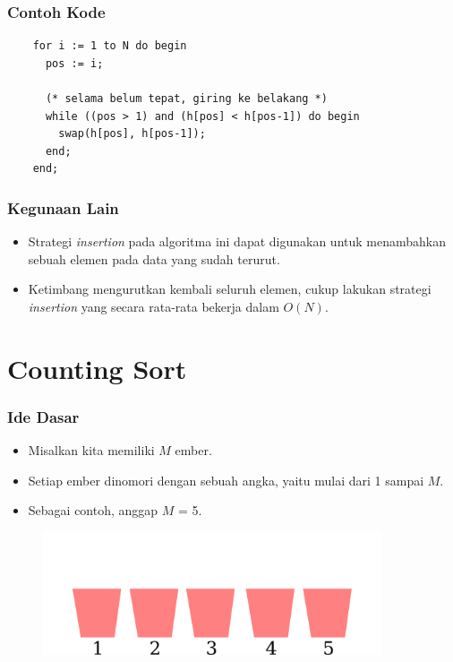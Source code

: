 \begin{frame}[fragile]
\frametitle{Contoh Kode}
  \begin{lstlisting}
    for i := 1 to N do begin
      pos := i;
      
      (* selama belum tepat, giring ke belakang *)
      while ((pos > 1) and (h[pos] < h[pos-1]) do begin
        swap(h[pos], h[pos-1]);
      end;
    end;
  \end{lstlisting}
\end{frame}

\begin{frame}
\frametitle{Kegunaan Lain}
  \begin{itemize}
    \item Strategi \textit{insertion} pada algoritma ini dapat digunakan untuk menambahkan sebuah elemen pada data yang sudah terurut.
    \item Ketimbang mengurutkan kembali seluruh elemen, cukup
    lakukan strategi \textit{insertion} yang secara rata-rata bekerja dalam
    $O(N)$.
  \end{itemize}
\end{frame}

\section{Counting Sort}
\frame{\sectionpage}

\begin{frame}
\frametitle{Ide Dasar}
  \begin{itemize}
    \item Misalkan kita memiliki $M$ ember.
    \item Setiap ember dinomori dengan sebuah angka, yaitu mulai dari 1 sampai $M$.
    \item Sebagai contoh, anggap $M$ = 5.
  \end{itemize}  
  \begin{figure}
    \includegraphics[width=10cm]{asset/counting-sort-1.pdf}
  \end{figure}
\end{frame}

